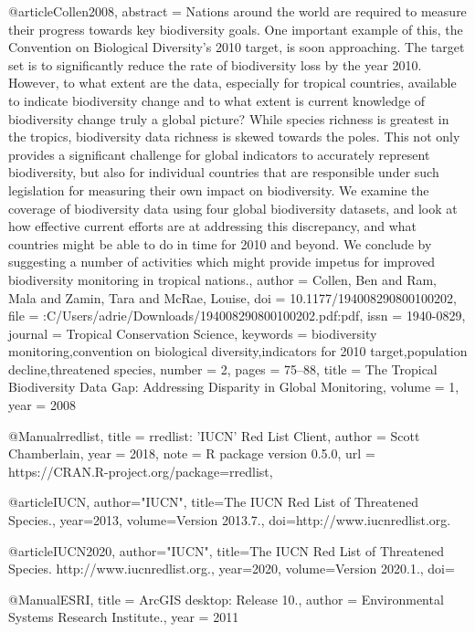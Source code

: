 {{{{{{@article{Collen2008,
abstract = {Nations around the world are required to measure their progress towards key biodiversity goals. One important example of this, the Convention on Biological Diversity's 2010 target, is soon approaching. The target set is to significantly reduce the rate of biodiversity loss by the year 2010. However, to what extent are the data, especially for tropical countries, available to indicate biodiversity change and to what extent is current knowledge of biodiversity change truly a global picture? While species richness is greatest in the tropics, biodiversity data richness is skewed towards the poles. This not only provides a significant challenge for global indicators to accurately represent biodiversity, but also for individual countries that are responsible under such legislation for measuring their own impact on biodiversity. We examine the coverage of biodiversity data using four global biodiversity datasets, and look at how effective current efforts are at addressing this discrepancy, and what countries might be able to do in time for 2010 and beyond. We conclude by suggesting a number of activities which might provide impetus for improved biodiversity monitoring in tropical nations.},
author = {Collen, Ben and Ram, Mala and Zamin, Tara and McRae, Louise},
doi = {10.1177/194008290800100202},
file = {:C\:/Users/adrie/Downloads/194008290800100202.pdf:pdf},
issn = {1940-0829},
journal = {Tropical Conservation Science},
keywords = {biodiversity monitoring,convention on biological diversity,indicators for 2010 target,population decline,threatened species},
number = {2},
pages = {75--88},
title = {{The Tropical Biodiversity Data Gap: Addressing Disparity in Global Monitoring}},
volume = {1},
year = {2008}
}


@Manual{rredlist,
    title = {rredlist: 'IUCN' Red List Client},
    author = {Scott Chamberlain},
    year = {2018},
    note = {R package version 0.5.0},
    url = {https://CRAN.R-project.org/package=rredlist},
  }

@article{IUCN, 
author="IUCN",
title={{The IUCN Red List of Threatened Species.}},
year={2013}, 
volume={Version 2013.7.}, 
doi={http://www.iucnredlist.org.}
}

@article{IUCN2020, 
author="IUCN",
title={{The IUCN Red List of Threatened Species. http://www.iucnredlist.org.}},
year={2020}, 
volume={Version 2020.1.}, 
doi={}
}


@Manual{ESRI,
   title = {ArcGIS desktop: Release 10.},
   author = {{Environmental Systems Research Institute.}},
   year = {2011}
  }

}}}}}}
